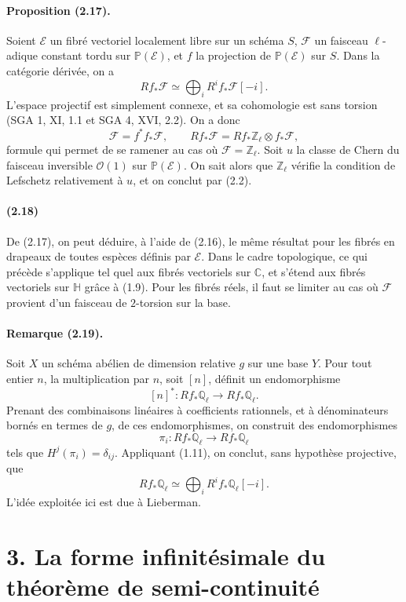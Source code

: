 \documentclass[10pt]{article}
\providecommand{\C}{\mathbb C}
\providecommand{\Ql}{\mathbb Q_\ell}
\providecommand{\Zl}{\mathbb Z_\ell}
\begin{document}
\paragraph{Proposition (2.17).} Soient $\mathcal E$ un fibré vectoriel localement libre sur un schéma $S$, $\mathcal F$ un faisceau $\ell$-adique constant tordu sur $\mathbb P(\mathcal E)$, et $f$ la projection de $\mathbb P(\mathcal E)$ sur $S$. Dans la catégorie dérivée, on a
\[
Rf_*\mathcal F\simeq\bigoplus_iR^if_*\mathcal F[-i].
\]
L'espace projectif est simplement connexe, et sa cohomologie est sans torsion (SGA 1, XI, 1.1 et SGA 4, XVI, 2.2). On a donc
\[
\mathcal F=f^*f_*\mathcal F,
\qquad
Rf_*\mathcal F=Rf_*\Zl\otimes f_*\mathcal F,
\]
formule qui permet de se ramener au cas où $\mathcal F=\Zl$. Soit $u$ la classe de Chern du faisceau inversible $\mathcal O(1)$ sur $\mathbb P(\mathcal E)$. On sait alors que $\Zl$ vérifie la condition de Lefschetz relativement à $u$, et on conclut par (2.2).

\paragraph{(2.18)} De (2.17), on peut déduire, à l'aide de (2.16), le même résultat pour les fibrés en drapeaux de toutes espèces définis par $\mathcal E$. Dans le cadre topologique, ce qui précède s'applique tel quel aux fibrés vectoriels sur $\C$, et s'étend aux fibrés vectoriels sur $\mathbb H$ grâce à (1.9). Pour les fibrés réels, il faut se limiter au cas où $\mathcal F$ provient d'un faisceau de $2$-torsion sur la base.

\paragraph{Remarque (2.19).} Soit $X$ un schéma abélien de dimension relative $g$ sur une base $Y$. Pour tout entier $n$, la multiplication par $n$, soit $[n]$, définit un endomorphisme
\[
[n]^*:Rf_*\Ql\longrightarrow Rf_*\Ql.
\]
Prenant des combinaisons linéaires à coefficients rationnels, et à dénominateurs bornés en termes de $g$, de ces endomorphismes, on construit des endomorphismes
\[
\pi_i:Rf_*\Ql\longrightarrow Rf_*\Ql
\]
tels que $H^j(\pi_i)=\delta_{ij}$. Appliquant (1.11), on conclut, sans hypothèse projective, que
\[
Rf_*\Ql\simeq\bigoplus_iR^if_*\Ql[-i].
\]
L'idée exploitée ici est due à Lieberman.

\section*{3. La forme infinitésimale du théorème de semi-continuité}
\end{document}
